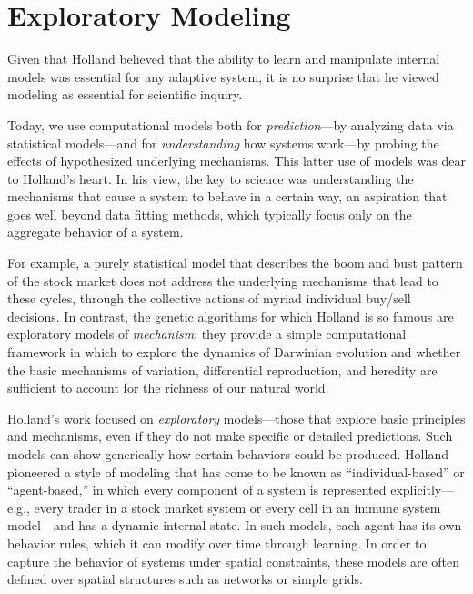 \documentclass{sig-alternate}
\begin{document}

\section{Exploratory Modeling}

Given that Holland believed that the ability to learn and manipulate
internal models was essential for any adaptive system, it is no
surprise that he viewed modeling as essential for scientific inquiry.


Today, we use computational models both for \emph{prediction}---by
analyzing data via statistical models---and for \emph{understanding}
how systems work---by probing the effects of hypothesized underlying
mechanisms.  This latter use of models was dear to Holland's heart.
In his view, the key to science was understanding the mechanisms that
cause a system to behave in a certain way, an aspiration that goes
well beyond data fitting methods, which typically focus only on
the aggregate behavior of a system.  

For example, a purely statistical model that describes the boom and bust
pattern of the stock market
does not address the underlying mechanisms
that lead to these cycles, through the collective actions of myriad
individual buy/sell decisions.  
In contrast, the genetic algorithms for which Holland is so famous
are exploratory models of \emph{mechanism}: they provide a simple
computational framework in which to explore the dynamics of Darwinian
evolution and whether the basic mechanisms of variation, differential
reproduction, and heredity are sufficient to account for the richness
of our natural world.

Holland's work focused on \emph{exploratory} models---those that explore basic principles and
mechanisms, even if they do not make specific or detailed
predictions\cite{Holland1995}.  Such models can show generically how certain behaviors
could be produced.  Holland pioneered a style of modeling that has
come to be known as ``individual-based'' or ``agent-based,'' in which
every component of a system is represented explicitly---e.g., every
trader in a stock market system or every cell in an immune system
model---and has a dynamic internal state. In such models, each agent has
its own behavior rules, which it can modify over time through learning.  In
order to capture the behavior of systems under spatial
constraints, these models are often defined over spatial structures
such as networks or simple grids.
\end{document}
